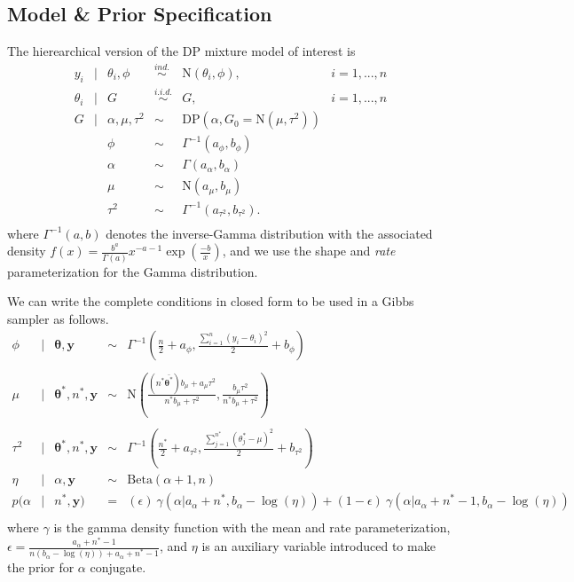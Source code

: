 \documentclass{article}
\def\suml{\sum\limits_{i=1}^n}
\def\ds{\displaystyle}
\newcommand{\m}[1]{\mathbf{\bm{#1}}} %
\def \stv{ \m{\theta} }
\def \stu{ \m{\theta^*} }
\def \y {\m{y}}
\begin{document}
\subsection{Model \& Prior Specification}
The hierearchical version of the DP mixture model of interest is 
\[
\begin{array}{rclcll}
  y_i &|& \theta_i,\phi &\overset{ind.}{\sim}& \text{N}(\theta_i, \phi), & i = 1,...,n\\
  \theta_i &|& G &\overset{i.i.d.}{\sim}&  G, & i = 1,...,n\\
  G &|& \alpha, \mu, \tau^2 &\sim& \text{DP}(\alpha, G_0=\text{N}(\mu,\tau^2))\\
    && \phi &\sim& \Gamma^{-1}(a_\phi,b_\phi) \\
    && \alpha &\sim& \Gamma(a_\alpha,b_\alpha) \\
    && \mu &\sim& \text{N}(a_\mu,b_\mu) \\
    && \tau^2 &\sim& \Gamma^{-1}(a_{\tau^2},b_{\tau^2}).\\
\end{array}
\]
where $\Gamma^{-1}(a,b)$ denotes the inverse-Gamma distribution with the associated density 
$f(x) = \ds \frac{b^a}{\Gamma(a)} x^{-a-1} \exp\left(\frac{-b}{x}\right)$, and we use the
shape and \emph{rate} parameterization for the Gamma distribution.

\noindent
We can write the complete conditions in closed form to be used in a Gibbs sampler as follows.
\[
\begin{array} {rclcl}
  \phi &|& \stv, \y &\sim& \Gamma^{-1}\left(\ds\frac{n}{2}+a_\phi,\frac{\suml (y_i-\theta_i)^2}{2} + b_\phi \right)\\
  \\
  \mu &|& \stu, n^*, \y &\sim& \text{N}\left(\ds \frac{(n^*\bar{\stu}) b_\mu + a_\mu\tau^2}{n^*b_\mu + \tau^2},
    \ds\frac{b_\mu \tau^2}{n^* b_\mu + \tau^2} \right)\\
  \\
  \tau^2 &|& \stu, n^*, \y &\sim& \Gamma^{-1}\left(\ds\frac{n^*}{2}+a_{\tau^2},
    \frac{\sum_{j=1}^{n^*} (\theta_j^*-\mu)^2}{2} + b_{\tau^2} \right)\\
  \eta &|& \alpha, \y &\sim& \text{Beta}(\alpha+1,n) \\
  p(\alpha &|& n^*, \y) &=& (\epsilon)~\gamma(\alpha | a_\alpha+n^*, b_\alpha-\log(\eta)) +
    (1-\epsilon)~\gamma(\alpha | a_\alpha+n^*-1, b_\alpha-\log(\eta))\\
\end{array}
\]
where $\gamma$ is the gamma density function with the mean and rate parameterization, 
$\epsilon = \ds\frac{a_\alpha +n^* - 1}{ n(b_\alpha-\log(\eta)) + a_\alpha +n^* -1}$,
and $\eta$ is an auxiliary variable introduced to make the prior for $\alpha$ conjugate. %
\end{document}
